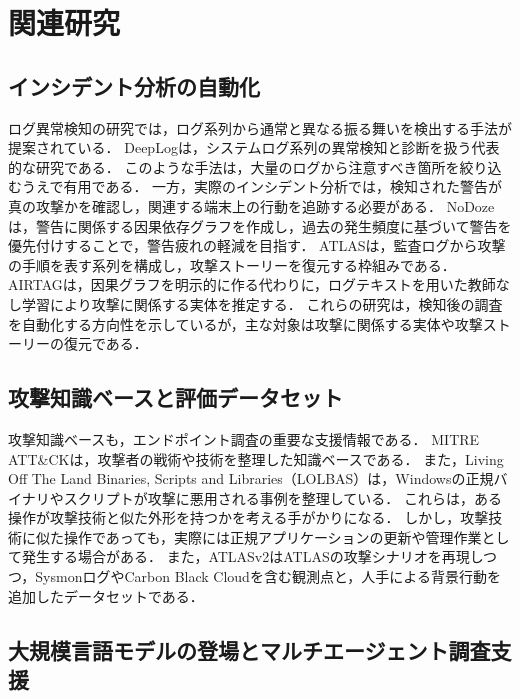 \documentclass[a4paper,twocolumn,10pt]{article}
\begin{document}
\section{関連研究}

\subsection{インシデント分析の自動化}

ログ異常検知の研究では，ログ系列から通常と異なる振る舞いを検出する手法が提案されている．
DeepLog\cite{deeplog}は，システムログ系列の異常検知と診断を扱う代表的な研究である．
このような手法は，大量のログから注意すべき箇所を絞り込むうえで有用である．
一方，実際のインシデント分析では，検知された警告が真の攻撃かを確認し，関連する端末上の行動を追跡する必要がある．
NoDoze\cite{nodoze}は，警告に関係する因果依存グラフを作成し，過去の発生頻度に基づいて警告を優先付けすることで，警告疲れの軽減を目指す．
ATLAS\cite{atlas}は，監査ログから攻撃の手順を表す系列を構成し，攻撃ストーリーを復元する枠組みである．
AIRTAG\cite{airtag}は，因果グラフを明示的に作る代わりに，ログテキストを用いた教師なし学習により攻撃に関係する実体を推定する．
これらの研究は，検知後の調査を自動化する方向性を示しているが，主な対象は攻撃に関係する実体や攻撃ストーリーの復元である．

\subsection{攻撃知識ベースと評価データセット}

攻撃知識ベースも，エンドポイント調査の重要な支援情報である．
MITRE ATT\&CK\cite{attack}は，攻撃者の戦術や技術を整理した知識ベースである．
また，Living Off The Land Binaries, Scripts and Libraries（LOLBAS）\cite{lolbas}は，Windowsの正規バイナリやスクリプトが攻撃に悪用される事例を整理している．
これらは，ある操作が攻撃技術と似た外形を持つかを考える手がかりになる．
しかし，攻撃技術に似た操作であっても，実際には正規アプリケーションの更新や管理作業として発生する場合がある．
また，ATLASv2\cite{atlasv2}はATLASの攻撃シナリオを再現しつつ，SysmonログやCarbon Black Cloudを含む観測点と，人手による背景行動を追加したデータセットである．

\subsection{大規模言語モデルの登場とマルチエージェント調査支援}
\end{document}

